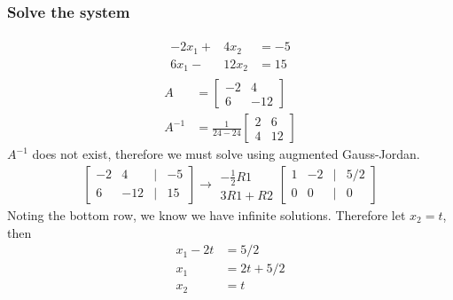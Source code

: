 \documentclass[14pt]{extarticle}
\begin{document}
\subsubsection{Solve the system}
\begin{align*}
	\begin{array}{ccc}
		-2x_1 + & 4x_2 & = -5 \\
		6x_1 - & 12x_2 & = 15
	\end{array}
\end{align*}
\begin{align*}
	A &= \begin{bmatrix}-2 & 4 \\	6 & -12	\end{bmatrix} \\
	A^{-1} &= \frac{1}{24-24} \begin{bmatrix}2 & 6 \\ 4 & 12	\end{bmatrix}
\end{align*}
$A^{-1}$ does not exist, therefore we must solve using augmented Gauss-Jordan.
\begin{align*}
	\begin{bmatrix}
		-2 & 4 & | & -5 \\
		6 & -12 & | & 15
	\end{bmatrix} \to
	\begin{array}{r}
		-\frac{1}{2}R1 \\
		3R1+R2
	\end{array}
	\begin{bmatrix}
		1 & -2 & | & 5/2 \\
		0 & 0 & | & 0
	\end{bmatrix}
\end{align*}
Noting the bottom row, we know we have infinite solutions. Therefore let $x_2=t$, then
\begin{align*}
	x_1-2t &= 5/2 \\
	x_1 &= 2t + 5/2 \\
	x_2 &= t
\end{align*}
\end{document}
